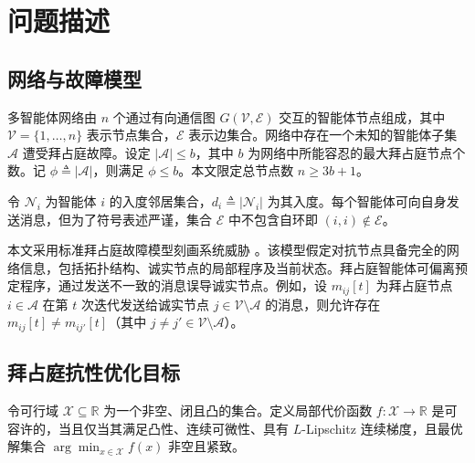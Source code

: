 \documentclass[12pt,hyperref,a4paper,UTF8]{ctexart}
\numberwithin{equation}{section}
\numberwithin{figure}{section}
\numberwithin{table}{section}
\begin{document}
\section{问题描述}

\subsection{网络与故障模型}
\quad \quad  多智能体网络由 $n$ 个通过有向通信图 $G(\mathcal{V},\mathcal{E})$ 交互的智能体节点组成，其中 $\mathcal{V} = \{1,\ldots,n\}$ 表示节点集合，$\mathcal{E}$ 表示边集合。网络中存在一个未知的智能体子集 $\mathcal{A}$ 遭受拜占庭故障。设定 $|\mathcal{A}| \le b$，其中 $b$ 为网络中所能容忍的最大拜占庭节点个数。记 $\phi \triangleq |\mathcal{A}|$，则满足 $\phi \le b$。本文限定总节点数 $n \ge 3b+1$。

令 $\mathcal{N}_i$ 为智能体 $i$ 的入度邻居集合，$d_i \triangleq |\mathcal{N}_i|$ 为其入度。每个智能体可向自身发送消息，但为了符号表述严谨，集合 $\mathcal{E}$ 中不包含自环即 $(i,i)\notin\mathcal{E}$。

本文采用标准拜占庭故障模型刻画系统威胁 \cite{lynch1996distributed}。该模型假定对抗节点具备完全的网络信息，包括拓扑结构、诚实节点的局部程序及当前状态。拜占庭智能体可偏离预定程序，通过发送不一致的消息误导诚实节点。例如，设 $m_{ij}[t]$ 为拜占庭节点 $i\in\mathcal{A}$ 在第 $t$ 次迭代发送给诚实节点 $j\in\mathcal{V}\setminus\mathcal{A}$ 的消息，则允许存在 $m_{ij}[t] \neq m_{ij'}[t]$（其中 $j\neq j'\in\mathcal{V}\setminus\mathcal{A}$）。

\subsection{拜占庭抗性优化目标}
\quad \quad  令可行域 $\mathcal{X}\subseteq\mathbb{R}$ 为一个非空、闭且凸的集合。定义局部代价函数 $f:\mathcal{X}\to\mathbb{R}$ 是可容许的，当且仅当其满足凸性、连续可微性、具有 $L$-Lipschitz 连续梯度，且最优解集合 $\arg\min_{x\in\mathcal{X}} f(x)$ 非空且紧致。
\end{document}
